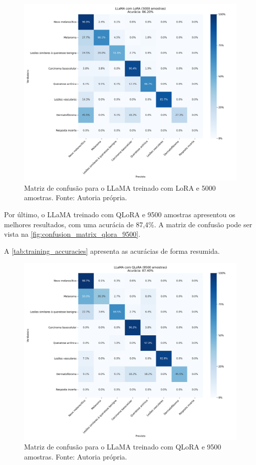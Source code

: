 \begin{figure}[ht]
    \centering
    \includegraphics[width=1\columnwidth,keepaspectratio]{images/confusion_matrix_lora_5000.png}
    \caption{\small Matriz de confusão para o \ac{LLaMA} treinado com \ac{LoRA} e 5000 amostras. Fonte: Autoria
        própria.}
    \label{fig:confusion_matrix_lora_5000}
\end{figure}

Por último, o \ac{LLaMA} treinado com \ac{QLoRA} e 9500 amostras apresentou os melhores resultados, com uma acurácia de 87,4\%. A matriz de confusão pode ser vista na
\autoref{fig:confusion_matrix_qlora_9500}.

A \autoref{tab:training_accuracies} apresenta as acurácias de forma resumida.

\begin{figure}[ht]
    \centering
    \includegraphics[width=1\columnwidth,keepaspectratio]{images/confusion_matrix_qlora_9500.png}
    \caption{\small Matriz de confusão para o \ac{LLaMA} treinado com \ac{QLoRA} e 9500 amostras. Fonte: Autoria
        própria.}
    \label{fig:confusion_matrix_qlora_9500}
\end{figure}

